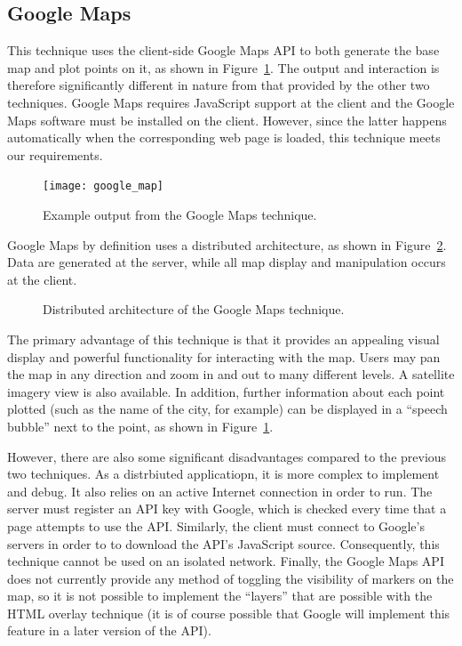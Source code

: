 \documentclass[acmtocl,acmnow]{acmtrans2m}
\begin{document}
\subsection{Google Maps}
\label{sec-google}

This technique uses the client-side Google Maps API
\cite{Goog-M-2006-maps} to both generate the base map and plot points on
it, as shown in Figure~\ref{fig-google}. The output and interaction is
therefore significantly different in nature from that provided by the
other two techniques. Google Maps requires JavaScript support at the
client and the Google Maps software must be installed on the client.
However, since the latter happens automatically when the corresponding
web page is loaded, this technique meets our requirements.


\begin{figure}
	\begin{center}
		\texttt{[image: google\_map]}
	\end{center}
	\caption{Example output from the Google Maps technique.}
	\label{fig-google}
\end{figure}


Google Maps by definition uses a distributed architecture, as shown in
Figure~\ref{fig-google-architecture}. Data are generated at the server,
while all map display and manipulation occurs at the client.


\begin{figure}
	\caption{Distributed architecture of the Google Maps technique.}
	\label{fig-google-architecture}
\end{figure}

The primary advantage of this technique is that it provides an appealing
visual display and powerful functionality for interacting with the map.
Users may pan the map in any direction and zoom in and out to many
different levels. A satellite imagery view is also available. In
addition, further information about each point plotted (such as the name
of the city, for example) can be displayed in a ``speech bubble'' next
to the point, as shown in Figure~\ref{fig-google}.

However, there are also some significant disadvantages compared to the
previous two techniques. As a distrbiuted applicatiopn, it is more
complex to implement and debug. It also relies on an active Internet
connection in order to run. The server must register an API key with
Google, which is checked every time that a page attempts to use the API.
Similarly, the client must connect to Google's servers in order to to
download the API's JavaScript source. Consequently, this technique
cannot be used on an isolated network. Finally, the Google Maps API does
not currently provide any method of toggling the visibility of markers
on the map, so it is not possible to implement the ``layers'' that are
possible with the HTML overlay technique (it is of course possible that
Google will implement this feature in a later version of the API).
\end{document}
